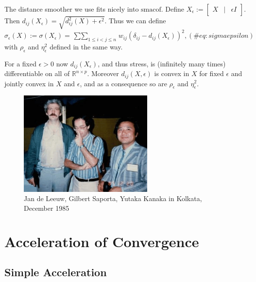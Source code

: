 \documentclass[
  12pt,
  letterpaper,
  DIV=11,
  numbers=noendperiod]{scrreprt}
\theoremstyle{remark}
\begin{document}
The distance smoother we use fits nicely into \(\textrm{smacof}\).
Define \(X_\epsilon:=\begin{bmatrix}X&\mid&\epsilon I\end{bmatrix}\).
Then \(d_{ij}(X_\epsilon)=\sqrt{d_{ij}^2(X)+\epsilon^2}\). Thus we can
define \begin{equation}
\sigma_\epsilon(X):=\sigma(X_\epsilon)=\mathop{\sum\sum}_{1\leq i<j\leq n}w_{ij}(\delta_{ij}- d_{ij}(X_\epsilon))^2,
(\#eq:sigmaepsilon)
\end{equation} with \(\rho_\epsilon\) and \(\eta^2_\epsilon\) defined in
the same way.

For a fixed \(\epsilon>0\) now \(d_{ij}(X_\epsilon)\), and thus stress,
is (infinitely many times) differentiable on all of
\(\mathbb{R}^{n\times p}\). Moreover \(d_{ij}(X,\epsilon)\) is convex in
\(X\) for fixed \(\epsilon\) and jointly convex in \(X\) and
\(\epsilon\), and as a consequence so are \(\rho_\epsilon\) and
\(\eta^2_\epsilon\).

\begin{figure}[H]

{\centering \includegraphics[width=0.6\textwidth,height=\textheight]{graphics/calcutta_12_85.png}

}

\caption{Jan de Leeuw, Gilbert Saporta, Yutaka Kanaka in Kolkata,
December 1985}

\end{figure}%


\chapter{Acceleration of Convergence}\label{chacceleration}

\section{Simple Acceleration}\label{accelsimple}
\end{document}
